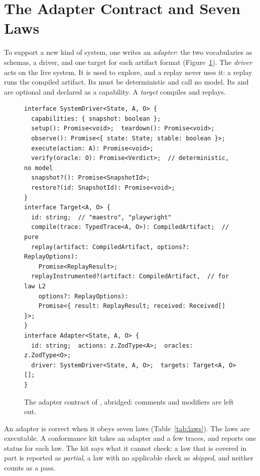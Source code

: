 \section{The Adapter Contract and Seven Laws}
\label{sec:contract}

To support a new kind of system, one writes an \emph{adapter}: the two vocabularies as schemas, a driver, and one target for each artifact format (Figure~\ref{fig:contract}). The \emph{driver} acts on the live system. It is used to explore, and a replay never uses it: a replay runs the compiled artifact. Its  must be deterministic and call no model. Its  and  are optional and declared as a capability. A \emph{target} compiles and replays.

\begin{figure}[t]
\begin{lstlisting}
interface SystemDriver<State, A, O> {
  capabilities: { snapshot: boolean };
  setup(): Promise<void>;  teardown(): Promise<void>;
  observe(): Promise<{ state: State; stable: boolean }>;
  execute(action: A): Promise<void>;
  verify(oracle: O): Promise<Verdict>;  // deterministic, no model
  snapshot?(): Promise<SnapshotId>;
  restore?(id: SnapshotId): Promise<void>;
}
interface Target<A, O> {
  id: string;  // "maestro", "playwright"
  compile(trace: TypedTrace<A, O>): CompiledArtifact;  // pure
  replay(artifact: CompiledArtifact, options?: ReplayOptions):
    Promise<ReplayResult>;
  replayInstrumented?(artifact: CompiledArtifact,  // for law L2
    options?: ReplayOptions):
    Promise<{ result: ReplayResult; received: Received[] }>;
}
interface Adapter<State, A, O> {
  id: string;  actions: z.ZodType<A>;  oracles: z.ZodType<O>;
  driver: SystemDriver<State, A, O>;  targets: Target<A, O>[];
}
\end{lstlisting}
\caption{The adapter contract of , abridged: comments and  modifiers are left out.}
\label{fig:contract}
\end{figure}

An adapter is correct when it obeys seven laws (Table~\ref{tab:laws}). The laws are executable. A conformance kit takes an adapter and a few traces, and reports one status for each law. The kit says what it cannot check: a law that is covered in part is reported as \emph{partial}, a law with no applicable check as \emph{skipped}, and neither counts as a pass.

